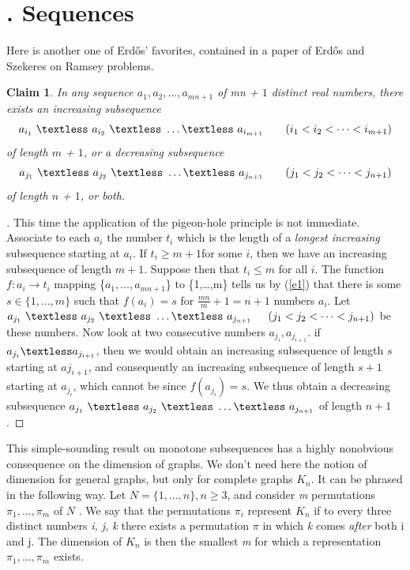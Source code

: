 \documentclass[10pt,twoside]{book}
\newcommand{\Font}[1]{\fontfamily{qhv}\selectfont #1}
\newtheorem*{claim}{Claim}
\begin{document}
		\section*{\Font{2. Sequences}}
		Here is another one of Erd\H{o}s’ favorites, contained in a paper of Erd\H{o}s and
		Szekeres on Ramsey problems.
		\begin{claim}
			In any sequence $a_1,a_2,...,a_{mn+1}$ of mn + $1$ distinct real
			numbers, there exists an increasing subsequence\\
			$$a_{i_{1}}\ \textless\ a_{i_{2}}\ \textless\ \dots \textless\ a_{i_{m+1}} \qquad (i_1 < i_2 < \dots <i_{m+1})$$
			of length $m$ + $1$, or a decreasing subsequence\\
			$$a_{j_{1}}\ \textless\ a_{j_{2}}\ \textless\ \dots \textless\ a_{j_{n+1}} \qquad (j_1 < j_2 < \dots <j_{n+1})$$
			of length $n$ + $1$, or both.
		\end{claim}
		\begin{proof}[\unskip\nopunct]
			This time the application of the pigeon-hole principle is not immediate. Associate to each $a_i$ the number $t_i$ which is the length of a \textit{longest increasing} subsequence starting at $a_i$. If $t_i \geq m + 1$for some $i$, then we have an increasing subsequence of length $m +1$. Suppose then that $t_i \leq
			m$ for all $i$. The function $f : a_i \rightarrow t_i$ mapping \{$a_1,\dots , a_{mn+1}$\} to \{1,\dots,m\} tells us by (\ref{e1}) that there is some $s \in \{1,\dots,m\}$ such that $f(a_i) = s$ for $\frac{mn}{m} + 1 = n + 1$ numbers $a_i$. Let $a_{j_{1}}\ \textless\ a_{j_{2}}\ \textless\ \dots \textless\ a_{j_{n+1}} \indent (j_1 < j_2 < \dots <j_{n+1})$ be these numbers. Now look at two consecutive numbers $a_{j_i}, a_{j_{i+1}}$. if $a_{j_i} \textless a_{j_{i+1}}$, then we would obtain an increasing subsequence of length $s$ starting at $a{j_{i+1}}$, and consequently an increasing subsequence of length $s+1$starting at $a_{j_{i}}$, which cannot be since $f(a_{j_{i}}) = s$. We thus obtain a decreasing subsequence $a_{j_{1}}\ \textless\ a_{j_{2}}\ \textless\ \dots \textless\ a_{j_{n+1}}$ of length $n +1$. 
		\end{proof}
		This simple-sounding result on monotone subsequences has a highly nonobvious consequence on the dimension of graphs. We don’t need here the notion of dimension for general graphs, but only for complete graphs $K_n$. It can be phrased in the following way. Let $N = \{1,\dots,n\}, n \geq 3$, and consider \textit{m} permutations $\pi_1,\dots,\pi_m$ of $N$ . We say that the permutations $\pi_i$ represent $K_n$ if to every three distinct numbers \textit{i, j, k} there exists a permutation $\pi$ in which \textit{k} comes \textit{after} both i and j. The dimension of $K_n$ is then the smallest \textit{m} for which a representation $\pi_1,\dots,\pi_m$ exists.
\end{document}
